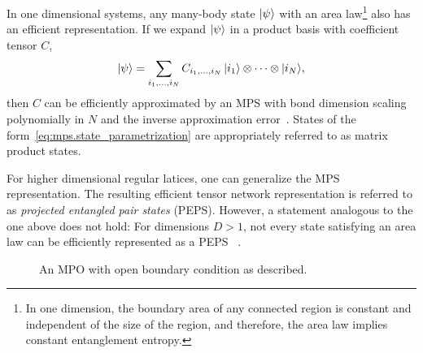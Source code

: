 In one dimensional systems, any many-body state $\ket{\psi}$ with an area law\footnote{%
  In one dimension, the boundary area of any connected region is constant and independent of the size of the region, and therefore, the area law implies constant entanglement entropy.
}
also has an efficient representation.
If we expand $\ket{\psi}$ in a product basis with coefficient tensor $C$,
\[
  \ket\psi = \sum_{i_1,\ldots,i_N} C_{i_1,\ldots,i_N} \, \ket{i_1} \otimes \cdots \otimes \ket{i_N},
  \label{eq:mps.state_parametrization}
\]
then $C$ can be efficiently approximated by an MPS with bond dimension scaling polynomially in $N$ and the inverse approximation error~\cite{Hastings_2006_Solving,Verstraete_2006_Matrix,Eisert_2010_Colloquium,Arad_2013_Area,Arad_2016_Rigorous}.
States of the form~\eqref{eq:mps.state_parametrization} are appropriately referred to as matrix product states.

For higher dimensional regular latices, one can generalize the MPS representation.
The resulting efficient tensor network representation is referred to as \emph{projected entangled pair states} (PEPS).
However, a statement analogous to the one above does not hold:
For dimensions $D > 1$, not every state satisfying an area law can be efficiently represented as a PEPS~\cite{}
.\\


\begin{figure*}
  \centering
  \caption{%
    \label{fig:mps.mpo}
    An MPO with open boundary condition as described.
  }
\end{figure*}


